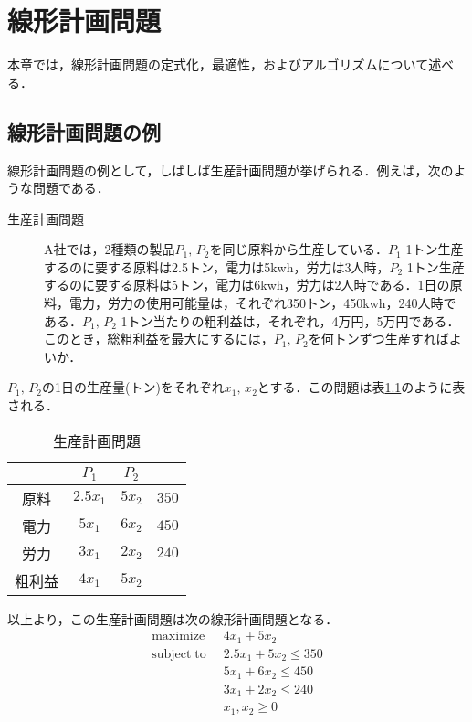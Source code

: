 \documentclass{jsreport}
\begin{document}
\chapter{線形計画問題}
本章では，線形計画問題の定式化，最適性，およびアルゴリズムについて述べる．
\section{線形計画問題の例}
線形計画問題の例として，しばしば生産計画問題が挙げられる．例えば，次のような問題である．
\begin{description}
  \item[生産計画問題]
  A社では，2種類の製品$P_1, \, P_2$を同じ原料から生産している．$P_1$ 1トン生産するのに要する原料は2.5トン，電力は5kwh，労力は3人時，$P_2$ 1トン生産するのに要する原料は5トン，電力は6kwh，労力は2人時である．1日の原料，電力，労力の使用可能量は，それぞれ350トン，450kwh，240人時である．$P_1, \, P_2$ 1トン当たりの粗利益は，それぞれ，4万円，5万円である．このとき，総粗利益を最大にするには，$P_1, \, P_2$を何トンずつ生産すればよいか．
\end{description}

$P_1, \, P_2$の1日の生産量(トン)をそれぞれ$x_1, \, x_2$とする．この問題は表\ref{tab:product_plan}のように表される．
\begin{table}[htb]
  \centering
    \caption{生産計画問題}
    \begin{tabular}{c|c|c|c}
       & $P_1$ & $P_2$ &  \\ \hline
      原料 & $2.5x_1$ & $5x_2$ & $350$ \\ \hline
      電力 & $5x_1$ & $6x_2$ & $450$ \\ \hline
      労力 & $3x_1$ & $2x_2$ & $240$ \\ \hline
      粗利益 & $4x_1$ & $5x_2$ & \\
    \end{tabular}
    \label{tab:product_plan}
\end{table}

以上より，この生産計画問題は次の線形計画問題となる．
\begin{align}\label{eq:product_plan}
  \mathrm{maximize} \; \; &4x_1 + 5x_2 \nonumber \\
  \mathrm{subject \; to} \; \; &2.5x_1 + 5x_2 \leq 350 \nonumber \\
  &5x_1 + 6x_2 \leq 450 \\
  &3x_1 + 2x_2 \leq 240 \nonumber \\
  &x_1, x_2 \geq 0 \nonumber
\end{align}
\end{document}
